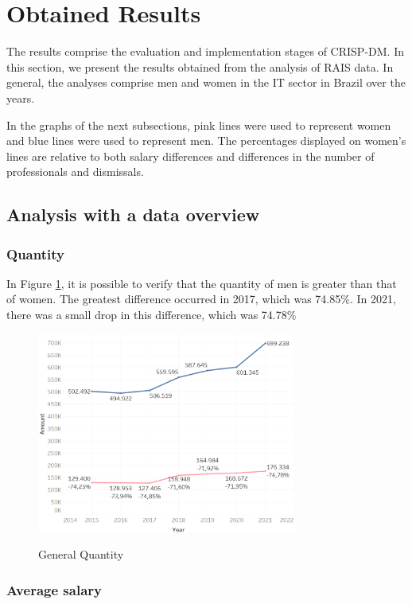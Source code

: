 \section{Obtained Results}

The results comprise the evaluation and implementation stages of CRISP-DM. In this section, we present the results obtained from the analysis of RAIS data. In general, the analyses comprise men and women in the IT sector in Brazil over the years.

In the graphs of the next subsections, pink lines were used to represent women and blue lines were used to represent men. The percentages displayed on women’s lines are relative to both salary differences and differences in the number of professionals and dismissals.

\subsection{Analysis with a data overview} \label{sub:geral}

\subsubsection{Quantity}

In Figure \ref{fig_1_qnt}, it is possible to verify that the quantity of men is greater than that of women. The greatest difference occurred in 2017, which was 74.85\%. In 2021, there was a small drop in this difference, which was 74.78\%

\begin{figure}[htbp]
	{
		\includegraphics[width=85mm]{assets/1_qnt.PNG}
	}
	\caption{General Quantity}
	\label{fig_1_qnt}
\end{figure}

\subsubsection{Average salary}

